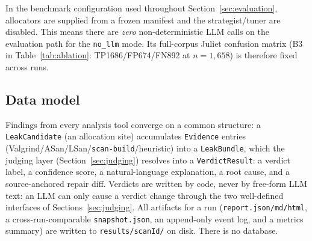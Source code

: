 \documentclass[11pt,a4paper]{article}
\begin{document}
\begin{table}[htbp]
\centering
\caption{The three POLICY modules and what they decide.}
\label{tab:policy}
\small
{}
\end{table}

In the benchmark configuration used throughout Section~\ref{sec:evaluation},
allocators are supplied from a frozen manifest and the strategist/tuner are
disabled. This means there are \emph{zero} non-deterministic LLM calls on
the evaluation path for the \texttt{no\_llm} mode. Its full-corpus Juliet
confusion matrix (B3 in Table~\ref{tab:ablation}: TP1686/FP674/FN892 at
$n{=}1{,}658$) is therefore fixed across runs.

\subsection{Data model}

Findings from every analysis tool converge on a common structure:
a \texttt{LeakCandidate} (an allocation site) accumulates \texttt{Evidence}
entries (Valgrind/ASan/LSan/\texttt{scan-build}/heuristic) into a
\texttt{LeakBundle}, which the judging layer (Section~\ref{sec:judging})
resolves into a \texttt{VerdictResult}: a verdict label, a confidence
score, a natural-language explanation, a root cause, and a source-anchored
repair diff. Verdicts are written by code, never by free-form LLM text: an
LLM can only cause a verdict change through the two well-defined
interfaces of Sections~\ref{sec:judging}. All artifacts for a run
(\texttt{report.json/md/html}, a cross-run-comparable
\texttt{snapshot.json}, an append-only event log, and a metrics summary)
are written to \texttt{results/\textlangle scanId\textrangle/} on disk. There is no
database.
\end{document}
